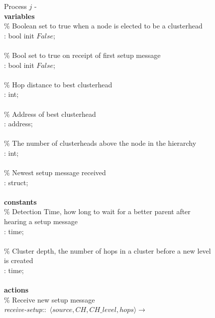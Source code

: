 \begin{figure}[H]
  \centering
  \begin{boxedminipage}{\linewidth}
    \null Process $j$ - \\
    \null \textbf{variables}\\
    \null\qq \% Boolean set to true when a node is elected to be a clusterhead\\
    \null\qq {}: bool init $False$;\\~\\
    \null\qq \% Bool set to true on receipt of first setup message\\
    \null\qq {}: bool init $False$;\\~\\
    \null\qq \% Hop distance to best clusterhead\\
    \null\qq {}: int;\\~\\
    \null\qq \% Address of best clusterhead\\
    \null\qq {}: address;\\~\\
    \null\qq \% The number of clusterheads above the node in the hierarchy\\
    \null\qq {}: int;\\~\\
    \null\qq \% Newest setup message received\\
    \null\qq {}: struct;\\~\\
    \null \textbf{constants}\\
    \null\qq \% Detection Time, how long to wait for a better parent after hearing a setup message\\
    \null\qq {}: time;\\~\\
    \null\qq \% Cluster depth, the number of hops in a cluster before a new level is created\\
    \null\qq {}: time;\\~\\
    \null \textbf{actions}\\
    \null\qq \% Receive new setup message\\
    \null\qq \emph{receive-setup}::~$\langle source, CH, CH\_level, hops\rangle \rightarrow$\\

\end{boxedminipage}
\end{figure}

